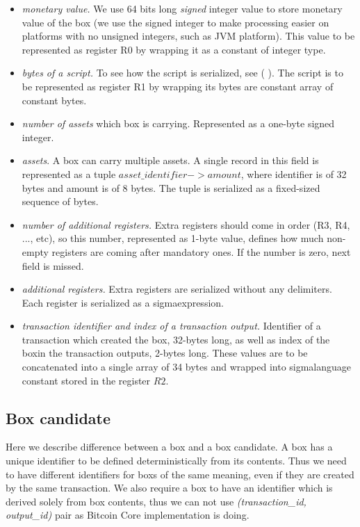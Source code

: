 \documentclass[]{article}   %
\newcommand{\authnote}[2]{\marginpar{\parbox{\marginparwidth}{\tiny %
  \textsf{#1 {\textcolor{blue}{notes: #2}}}}}%
  \textcolor{blue}{\textbf{\dag}}}
\newcommand{\authnote}[2]{
  \textsf{#1 \textcolor{blue}{: #2}}}
\newcommand{\authnote}[2]{}
\newcommand{\knote}[1]{{\authnote{\textcolor{green}{Alex notes}}{#1}}}
\newcommand{\coin}{box}
\newcommand{\Coin}{Box}
\newcommand{\sigm}{sigma}
\begin{document}
\begin{itemize}
    \item{\em monetary value. } We use 64 bits long {\em signed} integer value to store monetary value of the \coin{}
    (we use the signed integer to make processing easier on platforms with no unsigned integers, such as JVM platform).
    This value to be represented as register R0 by wrapping it as a constant of integer type.
    \item{\em bytes of a script. } To see how the script is serialized, see (\knote{link to \sigm language expressions
    serialization}). The script is to be represented as register R1 by wrapping its bytes are constant array of constant
    bytes.
    \item{\em number of assets } which box is carrying. Represented as a one-byte signed integer.
    \item{\em assets}. A box can carry multiple assets. A single record in this field is represented as a tuple
    $asset\_identifier -> amount$, where identifier is of 32 bytes and amount is of 8 bytes. The tuple is serialized as
    a fixed-sized sequence of bytes.
    \item{\em number of additional registers. } Extra registers should come in order (R3, R4, ..., etc), so this number,
    represented as 1-byte value, defines how much non-empty registers are coming after mandatory ones. If the number is
    zero, next field is missed.
    \item{\em additional registers. } Extra registers are serialized without any delimiters. Each register is
    serialized as a \sigm expression.
    \item{\em transaction identifier and index of a transaction output. } Identifier of a transaction which created
    the \coin{}, 32-bytes long, as well as index of the \coin in the transaction outputs, 2-bytes long. These values
    are to be concatenated into a single array of 34 bytes and wrapped into \sigm language constant stored in the
    register $R2$.
\end{itemize}



\subsection{\Coin{} candidate}
\label{coin-candidate}

Here we describe difference between a \coin{} and a \coin{} candidate. A \coin{} has a unique identifier to be defined
deterministically from its contents. Thus we need to have different identifiers for \coin{}s of the same meaning, even
if they are created by the same transaction. We also require a \coin{} to have an identifier which is derived solely
from \coin{} contents, thus we can not use {\em (transaction\_id, output\_id)} pair as Bitcoin Core implementation is
doing.
\end{document}
